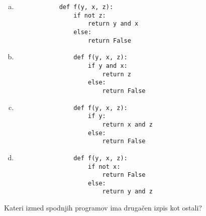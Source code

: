 \documentclass[arhiv, 10pt]{../izpit}
\begin{document}
        \begin{multicols}{2}
        \begin{enumerate}[(a)]
\item 
            \begin{verbatim}
            def f(y, x, z):
                if not z:
                    return y and x
                else:
                    return False
            \end{verbatim}
        
\item 
                \begin{verbatim}
                def f(y, x, z):
                    if y and x:
                        return z
                    else:
                        return False
                \end{verbatim}
            
\item 
                \begin{verbatim}
                def f(y, x, z):
                    if y:
                        return x and z
                    else:
                        return False
                \end{verbatim}
            
\item 
                \begin{verbatim}
                def f(y, x, z):
                    if not x:
                        return False
                    else:
                        return y and z
                \end{verbatim}
            
\end{enumerate}

        \end{multicols}
    
        \naloga*
        
        Kateri izmed spodnjih programov ima drugačen izpis kot ostali?
    
\end{document}

